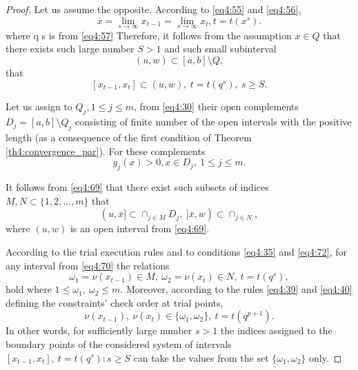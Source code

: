 \begin{proof}
  Let us assume the opposite. According to \eqref{eq4:55} and \eqref{eq4:56},
  \begin{displaymath}
    \overline x = \lim_{s\to\infty}x_{t-1}=\lim_{s\to\infty}x_t, t=t(x^s).
  \end{displaymath}
  where q s is from \eqref{eq4:57} Therefore, it follows from the assumption $x\in Q$ that there exists such large number $S>1$ and such small subinterval
  \begin{equation}
    \label{eq4:69}
    (u,w)\subset[a,b]\setminus Q,
  \end{equation}
  that
  \begin{equation}
    \label{eq4:70}
    [x_{t-1},x_t]\subset(u,w),\:t=t(q^s),\:s\ge S.
  \end{equation}

  Let us assign to $Q_j, 1\le j\le m$, from \eqref{eq4:30} their open complements $D_j=[a,b]\setminus Q_j$ consisting of finite number of the open intervals with the positive length (as a consequence of the first condition of Theorem \ref{th4:convergence_par}). For these complements
  \begin{equation}
    \label{eq4:71}
    g_j(x)>0,x\in D_j,\:1\le j\le m.
  \end{equation}

  It follows from \eqref{eq4:69} that there exist such subsets of indices $M,N\subset\{1,2,\dots,m\}$ that
  \begin{equation}
    \label{eq4:72}
    (u,\overline x]\subset \cap_{j\in M}D_j,\:[\overline x,w)\subset \cap_{j\in N},
  \end{equation}
  where $(u,w)$ is an open interval from \eqref{eq4:69}.

  According to the trial execution rules and to conditions \eqref{eq4:35} and \eqref{eq4:72}, for any interval from \eqref{eq4:70} the relations
  \begin{displaymath}
    \omega_1=\nu(x_{t-1})\in M,\: \omega_2=\nu(x_t)\in N,\:t=t(q^s),
  \end{displaymath}
  hold where $1\le \omega_1,\: \omega_2\le m$. Moreover, according to the rules \eqref{eq4:39} and \eqref{eq4:40} defining the constraints’ check order at trial points,
  \begin{displaymath}
    \nu(x_{t-1}),\:\nu(x_t)\in\{\omega_1,\omega_2\},\: t=t(q^{p+1}).
  \end{displaymath}
  In other words, for sufficiently large number $s>1$ the indices assigned to the boundary points of the considered system of intervals $[x_{t-1},x_t],\: t=t(q^s ): s\ge S$ can take the values from the set $\{\omega_1,\omega_2\}$ only.


\end{proof}
